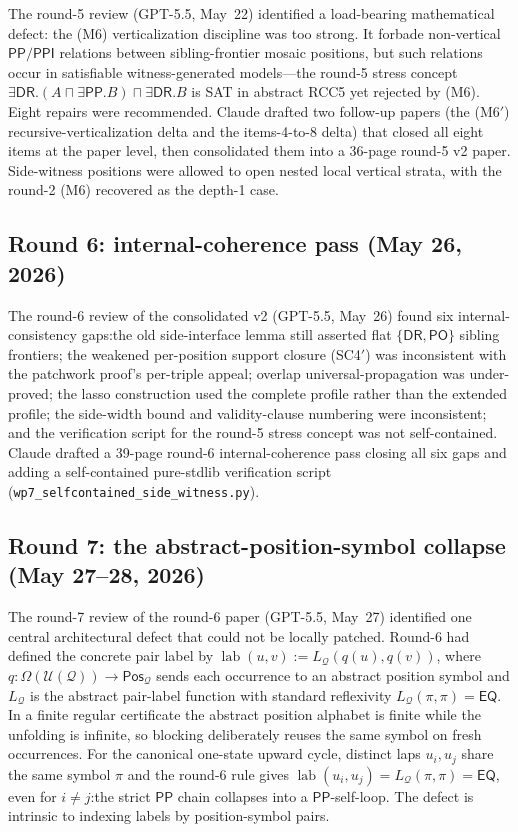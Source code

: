 \documentclass[
]{ceurart}
\theoremstyle{definition}
\newcommand{\DR}{\ensuremath{\mathsf{DR}}}
\newcommand{\PO}{\ensuremath{\mathsf{PO}}}
\newcommand{\EQ}{\ensuremath{\mathsf{EQ}}}
\newcommand{\PP}{\ensuremath{\mathsf{PP}}}
\newcommand{\PPI}{\ensuremath{\mathsf{PPI}}}
\newcommand{\Q}{\ensuremath{\mathcal Q}}
\newcommand{\U}{\ensuremath{\mathcal U}}
\newcommand{\Pos}{\ensuremath{\mathsf{Pos}}}
\newcommand{\lab}{\operatorname{lab}}
\begin{document}
The round-5 review (GPT-5.5, May~22) identified a load-bearing
mathematical defect: the (M6) verticalization discipline was too
strong.  It forbade non-vertical $\PP/\PPI$ relations between
sibling-frontier mosaic positions, but such relations occur in
satisfiable witness-generated models---the round-5 stress
concept $\exists\DR.(A\sqcap\exists\PP.B)\sqcap\exists\DR.B$ is
SAT in abstract RCC5 yet rejected by (M6).  Eight repairs were
recommended.  Claude drafted two follow-up papers (the
(M6$'$) recursive-verticalization delta and the items-4-to-8
delta) that closed all eight items at the paper level, then
consolidated them into a 36-page round-5 v2 paper.  Side-witness
positions were allowed to open nested local vertical strata,
with the round-2 (M6) recovered as the depth-1 case.

\subsection{Round 6: internal-coherence pass (May 26, 2026)}

The round-6 review of the consolidated v2 (GPT-5.5, May~26)
found six internal-consistency gaps:\@ the old side-interface
lemma still asserted flat $\{\DR,\PO\}$ sibling frontiers; the
weakened per-position support closure (SC4$'$) was inconsistent
with the patchwork proof's per-triple appeal; overlap
universal-propagation was under-proved; the lasso construction
used the complete profile rather than the extended profile;
the side-width bound and validity-clause numbering were
inconsistent; and the verification script for the round-5
stress concept was not self-contained.  Claude drafted a
39-page round-6 internal-coherence pass closing all six gaps
and adding a self-contained pure-stdlib verification script
(\texttt{wp7\_selfcontained\_side\_witness.py}).

\subsection{Round 7: the abstract-position-symbol collapse
(May 27--28, 2026)}

The round-7 review of the round-6 paper (GPT-5.5, May~27)
identified one central architectural defect that could not be
locally patched.  Round-6 had defined the concrete pair label
by $\lab(u,v):=L_\Q(q(u),q(v))$, where $q:\Omega(\U(\Q))\to
\Pos_\Q$ sends each occurrence to an abstract position symbol
and $L_\Q$ is the abstract pair-label function with standard
reflexivity $L_\Q(\pi,\pi)=\EQ$.  In a finite regular
certificate the abstract position alphabet is finite while the
unfolding is infinite, so blocking deliberately reuses the same
symbol on fresh occurrences.  For the canonical one-state
upward cycle, distinct laps $u_i,u_j$ share the same symbol
$\pi$ and the round-6 rule gives $\lab(u_i,u_j)=L_\Q(\pi,\pi)
=\EQ$, even for $i\ne j$:\@ the strict $\PP$ chain collapses
into a $\PP$-self-loop.  The defect is intrinsic to indexing
labels by position-symbol pairs.
\end{document}
